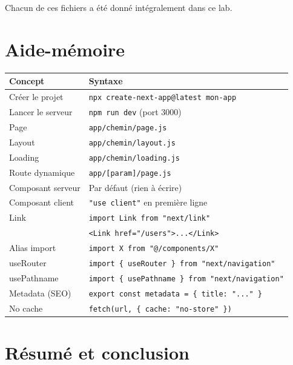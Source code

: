 \documentclass[11pt,a4paper]{article}
\begin{document}
Chacun de ces fichiers a été donné intégralement dans ce lab.

\section{Aide-mémoire}

\begin{center}
\begin{tabular}{lp{7.5cm}}
\toprule
\textbf{Concept} & \textbf{Syntaxe} \\
\midrule
Créer le projet & \texttt{npx create-next-app@latest mon-app} \\
Lancer le serveur & \texttt{npm run dev} (port 3000) \\
\midrule
Page & \texttt{app/chemin/page.js} \\
Layout & \texttt{app/chemin/layout.js} \\
Loading & \texttt{app/chemin/loading.js} \\
Route dynamique & \texttt{app/[param]/page.js} \\
\midrule
Composant serveur & Par défaut (rien à écrire) \\
Composant client & \texttt{"use client"} en première ligne \\
\midrule
Link & \texttt{import Link from "next/link"} \\
& \texttt{<Link href="/users">...</Link>} \\
Alias import & \texttt{import X from "@/components/X"} \\
useRouter & \texttt{import \{ useRouter \} from "next/navigation"} \\
usePathname & \texttt{import \{ usePathname \} from "next/navigation"} \\
Metadata (SEO) & \texttt{export const metadata = \{ title: "..." \}} \\
No cache & \texttt{fetch(url, \{ cache: "no-store" \})} \\
\bottomrule
\end{tabular}
\end{center}

\newpage

\section{Résumé et conclusion}
\end{document}
